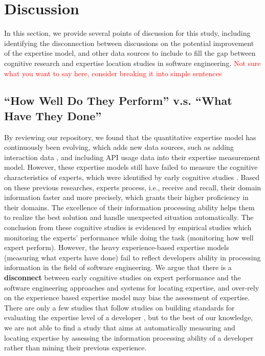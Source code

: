 \chapter{Discussion}

In this section, we provide several points of discussion for this study, including identifying the disconnection between discussions on the potential improvement of the expertise model, and other data sources to include to fill the gap between cognitive research and expertise location studies in software engineering. \textcolor{red}{Not sure what you want to say here, consider breaking it into simple sentences}

\section{``How Well Do They Perform'' v.s. ``What Have They Done''}

By reviewing our repository, we found that the quantitative expertise model has continuously been evolving, which adds new data sources, such as adding interaction data \cite{fritz2010degree}, and including API usage data \cite{schuler2008mining} into their expertise measurement model. However, these expertise models still have failed to measure the cognitive characteristics of experts, which were identified by early cognitive studies \cite{MCKEITHEN1981307, Simon:1996:SA:237774, gobet1996recall}. Based on these previous researches, experts process, i.e., receive and recall, their domain information faster and more precisely, which grants their higher proficiency in their domains. The excellence of their information processing ability helps them to realize the best solution and handle unexpected situation \cite{ericsson2006cambridge} automatically. The conclusion from these cognitive studies is evidenced by empirical studies which monitoring the experts' performance while doing the task (monitoring how well expert perform). However, the heavy experience-based expertise models (measuring what experts have done) fail to reflect developers ability in processing information in the field of software engineering. We argue that there is a \textbf{disconnect} between early cognitive studies on expert performance and the software engineering approaches and systems for locating expertise, and over-rely on the experience based expertise model may bias the assessment of expertise. There are only a few studies that follow studies on building standards for evaluating the expertise level of a developer \cite{bergersen2014construction}, but to the best of our knowledge, we are not able to find a study that aims at automatically measuring and locating expertise by assessing the information processing ability of a developer rather than mining their previous experience.

